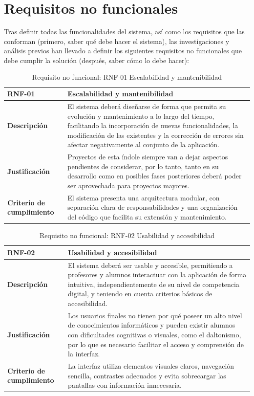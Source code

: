 \section{Requisitos no funcionales}
\label{sec:requisitos_no_funcionales}
Tras definir todas las funcionalidades del sistema, así como los requisitos que las conforman (primero, saber qué debe hacer el sistema), las investigaciones y análisis previos han llevado a definir los siguientes requisitos no funcionales que debe cumplir la solución (después, saber cómo lo debe hacer):
\begin{table}[H]
\centering
\begin{tabularx}{\textwidth}{
  |>{\centering\arraybackslash}l
  |>{\centering\arraybackslash}X|}
\hline
\textbf{RNF-01} & \textbf{Escalabilidad y mantenibilidad} \\ \hline
\textbf{Descripción} & El sistema deberá diseñarse de forma que permita su evolución y mantenimiento a lo largo del tiempo, facilitando la incorporación de nuevas funcionalidades, la modificación de las existentes y la corrección de errores sin afectar negativamente al conjunto de la aplicación. \\ \hline
\textbf{Justificación} & Proyectos de esta índole siempre van a dejar aspectos pendientes de considerar, por lo tanto, tanto en su desarrollo como en posibles fases posteriores deberá poder ser aprovechada para proyectos mayores. \\ \hline
\textbf{Criterio de cumplimiento} & El sistema presenta una arquitectura modular, con separación clara de responsabilidades y una organización del código que facilita su extensión y mantenimiento. \\ \hline
\end{tabularx}
\caption{Requisito no funcional: RNF-01 Escalabilidad y mantenibilidad}
\end{table}

\begin{table}[H]
\centering
\begin{tabularx}{\textwidth}{
  |>{\centering\arraybackslash}l
  |>{\centering\arraybackslash}X|}
\hline
\textbf{RNF-02} & \textbf{Usabilidad y accesibilidad} \\ \hline
\textbf{Descripción} & El sistema deberá ser usable y accesible, permitiendo a profesores y alumnos interactuar con la aplicación de forma intuitiva, independientemente de su nivel de competencia digital, y teniendo en cuenta criterios básicos de accesibilidad. \\ \hline
\textbf{Justificación} & Los usuarios finales no tienen por qué poseer un alto nivel de conocimientos informáticos y pueden existir alumnos con dificultades cognitivas o visuales, como el daltonismo, por lo que es necesario facilitar el acceso y comprensión de la interfaz. \\ \hline
\textbf{Criterio de cumplimiento} & La interfaz utiliza elementos visuales claros, navegación sencilla, contrastes adecuados y evita sobrecargar las pantallas con información innecesaria. \\ \hline
\end{tabularx}
\caption{Requisito no funcional: RNF-02 Usabilidad y accesibilidad}
\end{table}

